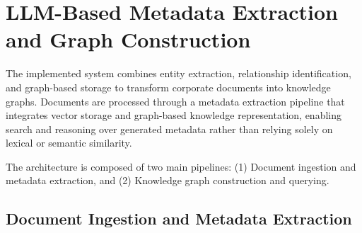 \section{LLM-Based Metadata Extraction and Graph Construction}\label{sec:metadata_extraction}
The implemented system combines entity extraction, relationship identification, and graph-based storage to transform corporate documents into knowledge graphs. Documents are processed through a metadata extraction pipeline that integrates vector storage and graph-based knowledge representation, enabling search and reasoning over generated metadata rather than relying solely on lexical or semantic similarity.

The architecture is composed of two main pipelines:  
(1) Document ingestion and metadata extraction, and  
(2) Knowledge graph construction and querying.

\subsection{Document Ingestion and Metadata Extraction}

